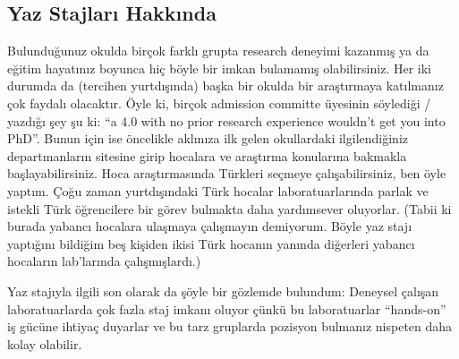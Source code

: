 \documentclass[12pt]{article}
\theoremstyle{break}
\begin{document}
\subsection{Yaz Stajları Hakkında}
Bulunduğunuz okulda birçok farklı grupta research deneyimi kazanmış ya da eğitim hayatınız boyunca hiç böyle bir imkan bulamamış olabilirsiniz. Her iki durumda da (tercihen yurtdışında) başka bir okulda bir araştırmaya katılmanız çok faydalı olacaktır. Öyle ki, birçok admission committe üyesinin söylediği / yazdığı şey şu ki: “a 4.0 with no prior research experience wouldn’t get you into PhD”. Bunun için ise öncelikle aklınıza ilk gelen okullardaki ilgilendiğiniz departmanların sitesine girip hocalara ve araştırma konularına bakmakla başlayabilirsiniz. Hoca araştırmasında Türkleri seçmeye çalışabilirsiniz, ben öyle yaptım. Çoğu zaman yurtdışındaki Türk hocalar laboratuarlarında parlak ve istekli Türk öğrencilere bir görev bulmakta daha yardımsever oluyorlar. (Tabii ki burada yabancı hocalara ulaşmaya çalışmayın demiyorum. Böyle yaz stajı yaptığını bildiğim beş kişiden ikisi Türk hocanın yanında diğerleri yabancı hocaların lab’larında çalışmışlardı.)

Yaz stajıyla ilgili son olarak da şöyle bir gözlemde bulundum: Deneysel çalışan laboratuarlarda çok fazla staj imkanı oluyor çünkü bu laboratuarlar “hands-on” iş gücüne ihtiyaç duyarlar ve bu tarz gruplarda pozisyon bulmanız nispeten daha kolay olabilir.
\end{document}
